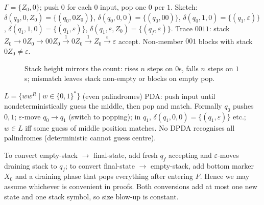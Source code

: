 \begin{example}[PDA for $L=\{0^n1^n\mid n\ge0\}$ by empty stack]
$\Gamma=\{Z_0,0\}$; push $0$ for each $0$ input, pop one $0$ per $1$. Sketch: $\delta(q_0,0,Z_0)=\{(q_0,0Z_0)\}$, $\delta(q_0,0,0)=\{(q_0,00)\}$, $\delta(q_0,1,0)=\{(q_1,\varepsilon)\}$, $\delta(q_1,1,0)=\{(q_1,\varepsilon)\}$, $\delta(q_1,\varepsilon,Z_0)=\{(q_f,\varepsilon)\}$. Trace $0011$: stack $Z_0\to0Z_0\to00Z_0\xrightarrow{1}0Z_0\xrightarrow{1}Z_0\xrightarrow{\varepsilon}\varepsilon$ accept. Non-member $001$ blocks with stack $0Z_0\neq\varepsilon$.
\end{example}

\begin{figure}[h]
\centering
{}
\caption{Stack height mirrors the count: rises $n$ steps on $0$s, falls $n$ steps on $1$s; mismatch leaves stack non-empty or blocks on empty pop.}
\label{fig:stack-height}
\end{figure}

\begin{example}
$L=\{ww^R\mid w\in\{0,1\}^*\}$ (even palindromes) PDA: push input until nondeterministically guess the middle, then pop and match. Formally $q_0$ pushes $0,1$; $\varepsilon$-move $q_0\to q_1$ (switch to popping); in $q_1$, $\delta(q_1,0,0)=\{(q_1,\varepsilon)\}$ etc.; $w\in L$ iff some guess of middle position matches. No DPDA recognises all palindromes (deterministic cannot guess centre).
\end{example}

\begin{remark}
To convert empty-stack $\to$ final-state, add fresh $q_f$ accepting and $\varepsilon$-moves draining stack to $q_f$; to convert final-state $\to$ empty-stack, add bottom marker $X_0$ and a draining phase that pops everything after entering $F$. Hence we may assume whichever is convenient in proofs.
Both conversions add at most one new state and one stack symbol, so size blow-up is constant.
\end{remark}

